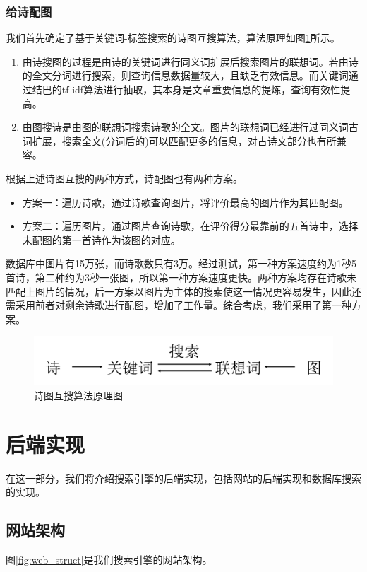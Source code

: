 \documentclass[a4paper, 10pt]{article}
\begin{document}
\subsubsection{给诗配图}
我们首先确定了基于关键词-标签搜索的诗图互搜算法，算法原理如图\ref{fig:poemimg}所示。
\begin{enumerate}[(1)]
    \item 由诗搜图的过程是由诗的关键词进行同义词扩展后搜索图片的联想词。若由诗的全文分词进行搜索，则查询信息数据量较大，且缺乏有效信息。而关键词通过结巴的tf-idf算法进行抽取，其本身是文章重要信息的提炼，查询有效性提高。
    \item 由图搜诗是由图的联想词搜索诗歌的全文。图片的联想词已经进行过同义词古词扩展，搜索全文(分词后的)可以匹配更多的信息，对古诗文部分也有所兼容。
\end{enumerate}

根据上述诗图互搜的两种方式，诗配图也有两种方案。
\begin{itemize}
    \item 方案一：遍历诗歌，通过诗歌查询图片，将评价最高的图片作为其匹配图。
    \item 方案二：遍历图片，通过图片查询诗歌，在评价得分最靠前的五首诗中，选择未配图的第一首诗作为该图的对应。
\end{itemize}

数据库中图片有15万张，而诗歌数只有3万。经过测试，第一种方案速度约为1秒5首诗，第二种约为3秒一张图，所以第一种方案速度更快。两种方案均存在诗歌未匹配上图片的情况，后一方案以图片为主体的搜索使这一情况更容易发生，因此还需采用前者对剩余诗歌进行配图，增加了工作量。综合考虑，我们采用了第一种方案。
\begin{figure}[H]
\centering
\includegraphics[width=0.8\linewidth]{fig/poemimg.png}
\caption{诗图互搜算法原理图}
\label{fig:poemimg}
\end{figure}


\section{后端实现}
在这一部分，我们将介绍搜索引擎的后端实现，包括网站的后端实现和数据库搜索的实现。

\subsection{网站架构}
图\ref{fig:web_struct}是我们搜索引擎的网站架构。
\end{document}
